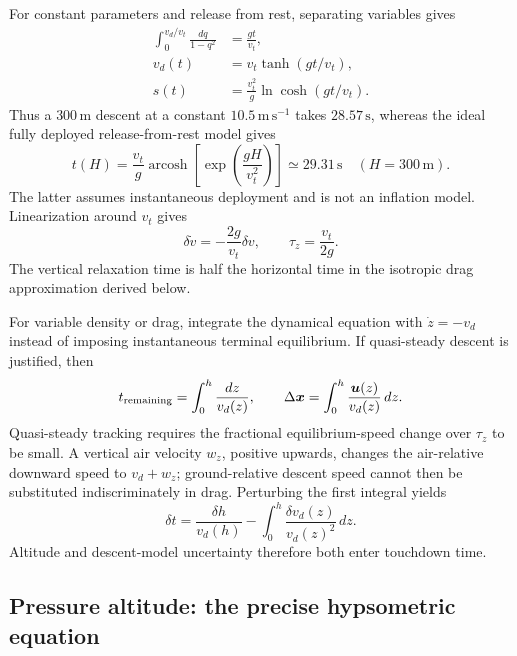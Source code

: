 \documentclass[11pt,a4paper]{article}
\numberwithin{equation}{section}
\begin{document}
For constant parameters and release from rest, separating variables gives
\begin{align}
 \int_0^{v_d/v_t}\frac{dq}{1-q^2}&=\frac{gt}{v_t},\\
 v_d(t)&=v_t\tanh(gt/v_t),\\
 s(t)&=\frac{v_t^2}{g}\ln\cosh(gt/v_t).
\end{align}
Thus a $300\,\mathrm m$ descent at a constant
$10.5\,\mathrm{m\,s^{-1}}$ takes $28.57\,\mathrm s$, whereas the ideal
fully deployed release-from-rest model gives
\begin{equation}
 t(H)=\frac{v_t}{g}\operatorname{arcosh}
       \left[\exp\left(\frac{gH}{v_t^2}\right)\right]
 \simeq29.31\,\mathrm s\quad(H=300\,\mathrm m).
\end{equation}
The latter assumes instantaneous deployment and is not an inflation model.
Linearization around $v_t$ gives
\begin{equation}
 \delta\dot v=-\frac{2g}{v_t}\delta v,
 \qquad \tau_z=\frac{v_t}{2g}.
\end{equation}
The vertical relaxation time is half the horizontal time in the isotropic
drag approximation derived below.

For variable density or drag, integrate the dynamical equation with
$\dot z=-v_d$ instead of imposing instantaneous terminal equilibrium.
If quasi-steady descent is justified, then
\begin{equation}
 t_{\rm remaining}=\int_0^h\frac{dz}{v_d(z)},\qquad
 \Delta\boldsymbol x=\int_0^h\frac{\boldsymbol u(z)}{v_d(z)}\,dz.
\end{equation}
Quasi-steady tracking requires the fractional equilibrium-speed change
over $\tau_z$ to be small. A vertical air velocity $w_z$, positive upwards,
changes the air-relative downward speed to $v_d+w_z$; ground-relative
descent speed cannot then be substituted indiscriminately in drag.
Perturbing the first integral yields
\begin{equation}
 \delta t=\frac{\delta h}{v_d(h)}
 -\int_0^h\frac{\delta v_d(z)}{v_d(z)^2}\,dz.
\end{equation}
Altitude and descent-model uncertainty therefore both enter touchdown time.

\subsection{Pressure altitude: the precise hypsometric equation}
\end{document}
